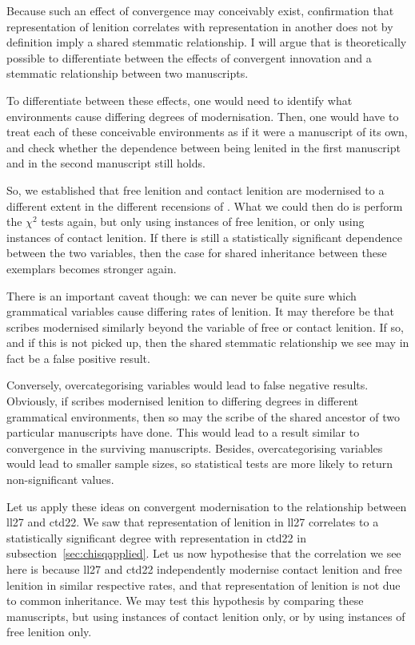 Because such an effect of convergence may conceivably exist, confirmation that representation of lenition  correlates with representation in another does not by definition imply a shared stemmatic relationship. I will argue that is theoretically possible to differentiate between the effects of convergent innovation and a stemmatic relationship between two manuscripts.

To differentiate between these effects, one would need to identify what environments cause differing degrees of modernisation. Then, one would have to treat each of these conceivable environments as if it were a manuscript of its own, and check whether the dependence between being lenited in the first manuscript and in the second manuscript still holds.

So, we established that free lenition and contact lenition are modernised to a different extent in the different recensions of . What we could then do is perform the \(\chi^2\) tests again, but only using instances of free lenition, or only using instances of contact lenition. If there is still a statistically significant dependence between the two variables, then the case for shared inheritance between these exemplars becomes stronger again.

There is an important caveat though: we can never be quite sure which grammatical variables cause differing rates of lenition. It may therefore be that scribes modernised similarly beyond the variable of free or contact lenition. If so, and if this is not picked up, then the shared stemmatic relationship we see may in fact be a false positive result.

Conversely, overcategorising variables would lead to false negative results. Obviously, if scribes modernised lenition to differing degrees in different grammatical environments, then so may the scribe of the shared ancestor of two particular manuscripts have done. This would lead to a result similar to convergence in the surviving manuscripts. Besides, overcategorising variables would lead to smaller sample sizes, so statistical tests are more likely to return non-significant values.

Let us apply these ideas on convergent modernisation to the relationship between \gls{ll27} and \gls{ctd22}. We saw that representation of lenition in \gls{ll27} correlates to a statistically significant degree with representation in \gls{ctd22} in subsection~\ref{sec:chisqapplied}. Let us now hypothesise that the correlation we see here is because \gls{ll27} and \gls{ctd22} independently modernise contact lenition and free lenition in similar respective rates, and that representation of lenition is not due to common inheritance. We may test this hypothesis by comparing these manuscripts, but using instances of contact lenition only, or by using instances of free lenition only. 


